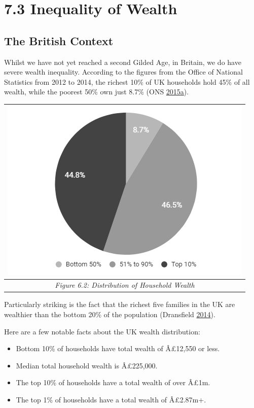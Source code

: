 \documentclass[]{tufte-handout}
\begin{document}
\hypertarget{inequality-of-wealth}{%
\section{7.3 Inequality of Wealth}\label{inequality-of-wealth}}

\hypertarget{the-british-context}{%
\subsection{The British Context}\label{the-british-context}}

Whilst we have not yet reached a second Gilded Age, in Britain, we do
have severe wealth inequality. According to the figures from the Office
of National Statistics from 2012 to 2014, the richest 10\% of UK
households hold 45\% of all wealth, while the poorest 50\% own just
8.7\% (ONS
\protect\hyperlink{ref-ONS2015}{2015}\protect\hyperlink{ref-ONS2015}{a}).

\begin{longtable}[]{@{}c@{}}
\toprule
\includegraphics{ChapterPictures/6-2-DistributionOfHouseholdWealth.png}\tabularnewline
\midrule
\endhead
\emph{Figure 6.2: Distribution of Household Wealth}\tabularnewline
\bottomrule
\end{longtable}

Particularly striking is the fact that the richest five families in the
UK are wealthier than the bottom 20\% of the population (Dransfield
\protect\hyperlink{ref-Dransfield2014}{2014}).

Here are a few notable facts about the UK wealth distribution:

\begin{itemize}
\item
  Bottom 10\% of households have total wealth of Â£12,550 or less.
\item
  Median total household wealth is Â£225,000.
\item
  The top 10\% of households have a total wealth of over Â£1m.
\item
  The top 1\% of households have a total wealth of Â£2.87m+.
\end{itemize}
\end{document}
